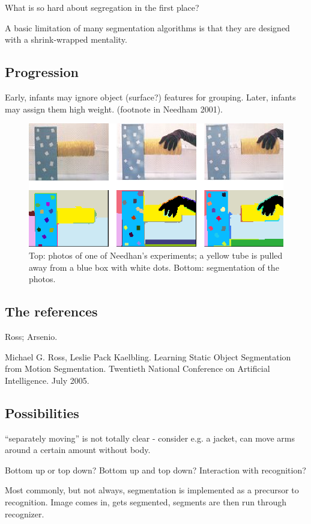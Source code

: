 What is so hard about segregation in the first place?

A basic limitation of many segmentation algorithms is
that they are designed with a shrink-wrapped mentality.


\subsection{Progression}

Early, infants may ignore object (surface?) features for grouping.
Later, infants may assign them high weight. (footnote in
Needham 2001).


\begin{figure}

\centerline{\includegraphics[width=0.5\columnwidth]{fig-pull}}

\caption{
Top: photos of one of Needhan's experiments; a yellow tube is 
pulled away from a blue box with white dots.
Bottom: segmentation of the photos.
}

\end{figure}


\subsection{The references}

Ross; Arsenio.


Michael G. Ross, Leslie Pack Kaelbling. Learning Static Object
Segmentation from Motion Segmentation. Twentieth National Conference
on Artificial Intelligence. July 2005.

\subsection{Possibilities}

``separately moving'' is not totally clear - consider e.g. a 
jacket, can move arms around a certain amount without body.

Bottom up or top down?  Bottom up and top down?  Interaction
with recognition?

Most commonly, but not always, segmentation is implemented
as a precursor to recognition.  Image comes in, gets
segmented, segments are then run through recognizer.


